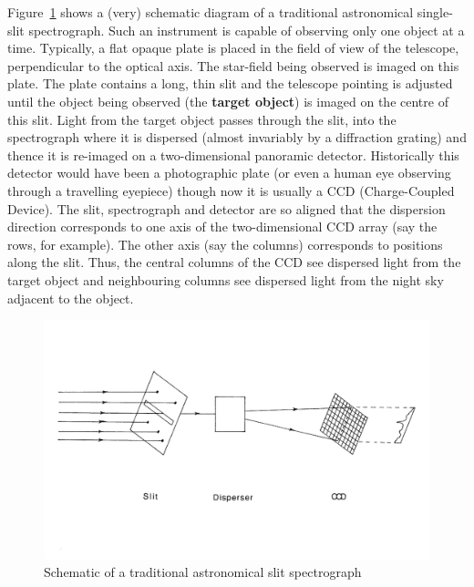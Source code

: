 \documentclass[chapters,twoside,11pt]{starlink}
\begin{document}
Figure~\ref{SLITSPR1} shows a (very) schematic diagram of a traditional
astronomical single-slit spectrograph.  Such an instrument is capable of
observing only one object at a time.  Typically, a flat opaque plate is
placed in the field of view of the telescope, perpendicular to the optical
axis.  The star-field being observed is imaged on this plate.  The plate
contains a long, thin slit and the telescope pointing is adjusted until
the object being observed (the \textbf{target object}) is imaged on the
centre of this slit.  Light from the target object passes through the
slit, into the spectrograph where it is dispersed (almost invariably by
a diffraction grating) and thence it is re-imaged on a two-dimensional
panoramic detector.  Historically this detector would have been a
photographic plate (or even a human eye observing through a travelling
eyepiece) though now it is usually a CCD (Charge-Coupled Device).  The
slit, spectrograph and detector are so aligned that the dispersion
direction corresponds to one axis of the two-dimensional CCD array
(say the rows, for example).  The other axis (say the columns)
corresponds to positions along the slit.  Thus, the central columns
of the CCD see dispersed light from the target object and neighbouring
columns see dispersed light from the night sky adjacent to the object.

\begin{figure}[htbp]
   \centering
   \includegraphics[width=\textwidth]{sc14_spectrograph}
   \caption{Schematic of a traditional astronomical slit spectrograph
   \label{SLITSPR1} }
\end{figure}
\end{document}
